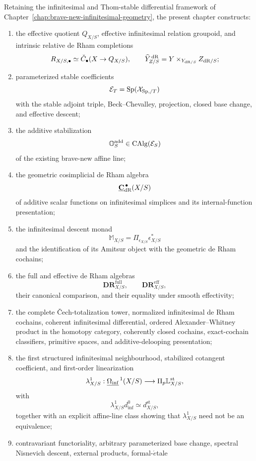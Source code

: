 Retaining the infinitesimal and Thom-stable differential framework of
Chapter~\ref{chap:brave-new-infinitesimal-geometry}, the present chapter
constructs:
\begin{enumerate}
\item the effective quotient \(Q_{X/S}\), effective infinitesimal relation
groupoid, and intrinsic relative de Rham completions
\[
    R_{X/S,\bullet}
    \simeq
    \check C_\bullet(X\to Q_{X/S}),
    \qquad
    \widehat Y^{\,\mathrm{dR}}_{Z/S}
    =
    Y\times_{Y_{\mathrm{dR}/S}}Z_{\mathrm{dR}/S};
\]
\item parameterized stable coefficients
\[
    \mathcal E_T=\mathrm{Sp}(\mathcal X_{\mathrm{Sp},/T})
\]
with the stable adjoint triple, Beck--Chevalley, projection, closed base
change, and effective descent;
\item the additive stabilization
\[
    \mathbb O_S^{\mathrm{add}}\in\operatorname{CAlg}(\mathcal E_S)
\]
of the existing brave-new affine line;
\item the geometric cosimplicial de Rham algebra
\[
    \underline{\mathbf C}_{\mathrm{dR}}^{\,\bullet}(X/S)
\]
of additive scalar functions on infinitesimal simplices and its
internal-function presentation;
\item the infinitesimal descent monad
\[
    \mathbb M_{X/S}=\Pi_{\epsilon_{X/S}}\epsilon_{X/S}^*
\]
and the identification of its Amitsur object with the geometric de Rham
cochains;
\item the full and effective de Rham algebras
\[
    \mathbf{DR}^{\mathrm{full}}_{X/S},
    \qquad
    \mathbf{DR}^{\mathrm{eff}}_{X/S},
\]
their canonical comparison, and their equality under smooth effectivity;
\item the complete \v{C}ech-totalization tower, normalized infinitesimal de
Rham cochains, coherent infinitesimal differential, ordered
Alexander--Whitney product in the homotopy category, coherently closed
cochains, exact-cochain classifiers, primitive spaces, and
additive-delooping presentation;
\item the first structured infinitesimal neighbourhood, stabilized cotangent
coefficient, and first-order linearization
\[
    \lambda^1_{X/S}:
    \underline{\Omega_{\mathrm{inf}}}^{\,1}(X/S)
    \longrightarrow
    \Pi_p\mathbb L^{\mathrm{st}}_{X/S},
\]
with
\[
    \lambda^1_{X/S}d_{\inf}^0
    \simeq
    d^{\mathrm{st}}_{X/S},
\]
together with an explicit affine-line class showing that
\(\lambda^1_{X/S}\) need not be an equivalence;
\item contravariant functoriality, arbitrary parameterized base change,
spectral Nisnevich descent, external products, formal-\(\acute{e}\)tale

\end{enumerate}
